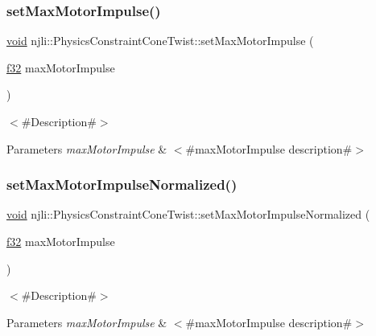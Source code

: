 \subsubsection{\texorpdfstring{set\+Max\+Motor\+Impulse()}{setMaxMotorImpulse()}}
{\footnotesize\ttfamily \mbox{\hyperlink{_thread_8h_af1e856da2e658414cb2456cb6f7ebc66}{void}} njli\+::\+Physics\+Constraint\+Cone\+Twist\+::set\+Max\+Motor\+Impulse (\begin{DoxyParamCaption}\item[{\mbox{\hyperlink{_util_8h_a5f6906312a689f27d70e9d086649d3fd}{f32}}}]{max\+Motor\+Impulse }\end{DoxyParamCaption})}

$<$\#\+Description\#$>$


\begin{DoxyParams}{Parameters}
{\em max\+Motor\+Impulse} & $<$\#max\+Motor\+Impulse description\#$>$ \\
\hline
\end{DoxyParams}
\mbox{\label{classnjli_1_1_physics_constraint_cone_twist_a6c0ffec35cf8e2d669f7333c1d889a21}} 
\subsubsection{\texorpdfstring{set\+Max\+Motor\+Impulse\+Normalized()}{setMaxMotorImpulseNormalized()}}
{\footnotesize\ttfamily \mbox{\hyperlink{_thread_8h_af1e856da2e658414cb2456cb6f7ebc66}{void}} njli\+::\+Physics\+Constraint\+Cone\+Twist\+::set\+Max\+Motor\+Impulse\+Normalized (\begin{DoxyParamCaption}\item[{\mbox{\hyperlink{_util_8h_a5f6906312a689f27d70e9d086649d3fd}{f32}}}]{max\+Motor\+Impulse }\end{DoxyParamCaption})}

$<$\#\+Description\#$>$


\begin{DoxyParams}{Parameters}
{\em max\+Motor\+Impulse} & $<$\#max\+Motor\+Impulse description\#$>$ \\
\hline
\end{DoxyParams}
\mbox{\label{classnjli_1_1_physics_constraint_cone_twist_aa9330c775b1d77026c0b3b23d8750bab}} 
